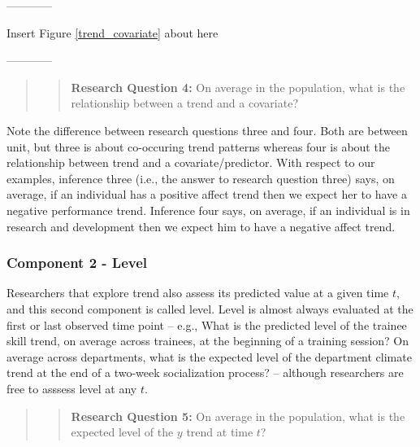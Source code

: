 \documentclass[english,,man]{apa6}
\theoremstyle{definition}
\theoremstyle{definition}
\theoremstyle{definition}
\theoremstyle{remark}
\begin{document}
\begin{center}

------------

Insert Figure \ref{trend_covariate} about here

------------

\end{center}

\begin{quote}
\begin{quote}
\textbf{Research Question 4:} On average in the population, what is the
relationship between a trend and a covariate?
\end{quote}
\end{quote}

Note the difference between research questions three and four. Both are
between unit, but three is about co-occuring trend patterns whereas four
is about the relationship between trend and a covariate/predictor. With
respect to our examples, inference three (i.e., the answer to research
question three) says, on average, if an individual has a positive affect
trend then we expect her to have a negative performance trend. Inference
four says, on average, if an individual is in research and development
then we expect him to have a negative affect trend.

\hypertarget{component-2---level}{%
\subsubsection{Component 2 - Level}\label{component-2---level}}

Researchers that explore trend also assess its predicted value at a
given time \(t\), and this second component is called level. Level is
almost always evaluated at the first or last observed time point --
e.g., What is the predicted level of the trainee skill trend, on average
across trainees, at the beginning of a training session? On average
across departments, what is the expected level of the department climate
trend at the end of a two-week socialization process? -- although
researchers are free to asssess level at any \(t\).

\begin{quote}
\begin{quote}
\textbf{Research Question 5:} On average in the population, what is the
expected level of the \(y\) trend at time \(t\)?
\end{quote}
\end{quote}
\end{document}
